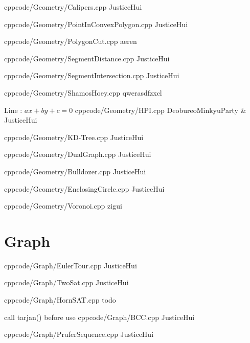 \documentclass[landscape, 8pt, a4paper, oneside]{extarticle} %
\begin{document}
\begin{multicols*}{3}
{}{}
{cpp}{code/Geometry/Calipers.cpp}
{JusticeHui}

{}{}
{cpp}{code/Geometry/PointInConvexPolygon.cpp}
{JusticeHui}

{}{}
{cpp}{code/Geometry/PolygonCut.cpp}
{aeren} %

{}{}
{cpp}{code/Geometry/SegmentDistance.cpp}
{JusticeHui} %

{}{}
{cpp}{code/Geometry/SegmentIntersection.cpp}
{JusticeHui} %

{}{}
{cpp}{code/Geometry/ShamosHoey.cpp}
{qwerasdfzxcl} %

{Line : $ax + by + c = 0$}{}
{cpp}{code/Geometry/HPI.cpp}
{DeobureoMinkyuParty & JusticeHui}

{}{}
{cpp}{code/Geometry/KD-Tree.cpp}
{JusticeHui}

{}{}
{cpp}{code/Geometry/DualGraph.cpp}
{JusticeHui}

{}{}
{cpp}{code/Geometry/Bulldozer.cpp}
{JusticeHui}

{}{}
{cpp}{code/Geometry/EnclosingCircle.cpp}
{JusticeHui}


{}{}
{cpp}{code/Geometry/Voronoi.cpp}
{zigui} %

\section{Graph}

{}{}
{cpp}{code/Graph/EulerTour.cpp}
{JusticeHui}

{}{}
{cpp}{code/Graph/TwoSat.cpp}
{JusticeHui} %

{}{}
{cpp}{code/Graph/HornSAT.cpp}
{todo} %

{call tarjan() before use}{}
{cpp}{code/Graph/BCC.cpp}
{JusticeHui}

{}{}
{cpp}{code/Graph/PruferSequence.cpp}
{JusticeHui}


\end{multicols*}
\end{document}
